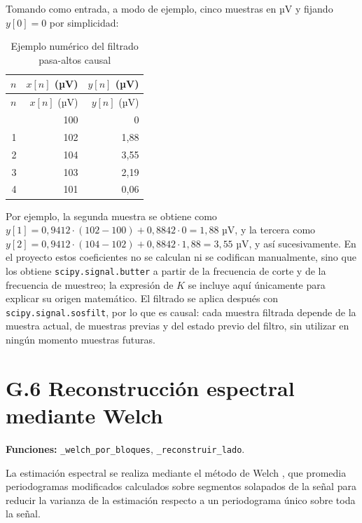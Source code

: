 \documentclass[
  spanish,
  a4paper,
  12pt,
  twoside]{memoir}
\begin{document}
Tomando como entrada, a modo de ejemplo, cinco muestras en µV y fijando
\(y[0]=0\) por simplicidad:

\begin{longtable}[]{@{}rrr@{}}
\caption{Ejemplo numérico del filtrado pasa-altos
causal}\label{tbl-ejemplo-filtro}\tabularnewline
\toprule\noalign{}
\(n\) & \(x[n]\) (µV) & \(y[n]\) (µV) \\
\midrule\noalign{}
\endfirsthead
\toprule\noalign{}
\(n\) & \(x[n]\) (µV) & \(y[n]\) (µV) \\
\midrule\noalign{}
\endhead
\bottomrule\noalign{}
\endlastfoot
0 & 100 & 0 \\
1 & 102 & 1,88 \\
2 & 104 & 3,55 \\
3 & 103 & 2,19 \\
4 & 101 & 0,06 \\
\end{longtable}

Por ejemplo, la segunda muestra se obtiene como
\(y[1] = 0{,}9412\cdot(102-100) + 0{,}8842\cdot 0 = 1{,}88\) µV, y la
tercera como
\(y[2] = 0{,}9412\cdot(104-102) + 0{,}8842\cdot 1{,}88 = 3{,}55\) µV, y
así sucesivamente. En el proyecto estos coeficientes no se calculan ni
se codifican manualmente, sino que los obtiene
\texttt{scipy.signal.butter} a partir de la frecuencia de corte y de la
frecuencia de muestreo; la expresión de \(K\) se incluye aquí únicamente
para explicar su origen matemático. El filtrado se aplica después con
\texttt{scipy.signal.sosfilt}, por lo que es causal: cada muestra
filtrada depende de la muestra actual, de muestras previas y del estado
previo del filtro, sin utilizar en ningún momento muestras futuras.

\chapter{G.6 Reconstrucción espectral mediante
Welch}\label{g.6-reconstrucciuxf3n-espectral-mediante-welch}

\textbf{Funciones:} \texttt{\_welch\_por\_bloques},
\texttt{\_reconstruir\_lado}.

La estimación espectral se realiza mediante el método de Welch
\citep{Welch1967}, que promedia periodogramas modificados calculados
sobre segmentos solapados de la señal para reducir la varianza de la
estimación respecto a un periodograma único sobre toda la señal.
\end{document}
